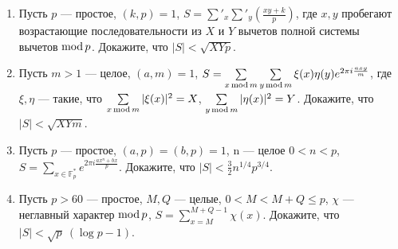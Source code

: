 \begin{enumerate}[topsep=0pt]
    \item Пусть $p$ --- простое, $(k,p)=1$, $S=\sum'_x \sum'_y \left(\frac{xy+k}{p}\right)$, где $x,y$ пробегают возрастающие последовательности из $X$ и $Y$ вычетов полной системы вычетов $\operatorname{mod} p$. Докажите, что $|S|<\sqrt{XYp}$. %

    \item Пусть $m>1$ --- целое, $(a,m)=1$, $S=\sum\limits_{x \operatorname{mod} m}\sum\limits_{y \operatorname{mod} m} \xi(x) \eta(y) e^{2\pi i \frac{axy}{m}}$, где $\xi,\eta$ --- такие, что $\sum\limits_{x \operatorname{mod} m} |\xi(x)|^2=X$, $\sum\limits_{y \operatorname{mod} m} |\eta(x)|^2=Y$. Докажите, что $|S|<\sqrt{XYm}$. %

    \item Пусть $p$ --- простое, $(a,p)=(b,p)=1$, n --- целое $0<n<p$, $S=\sum\limits_{x \in \mathbb{F}_p^*} e^{2\pi i \frac{ax^n+bx}{p}}$. Докажите, что $|S| < \frac{3}{2} n^{1/4} p^{3/4}$. %

    \item Пусть $p>60$ --- простое, $M,Q$ --- целые, $0<M<M+Q\leqslant p$, $\chi$ --- неглавный характер $\operatorname{mod} p$, $S = \sum\limits_{x=M}^{M+Q-1} \chi(x)$. Докажите, что $|S|<\sqrt{p}\ (\log p - 1)$. %
  
\end{enumerate}




